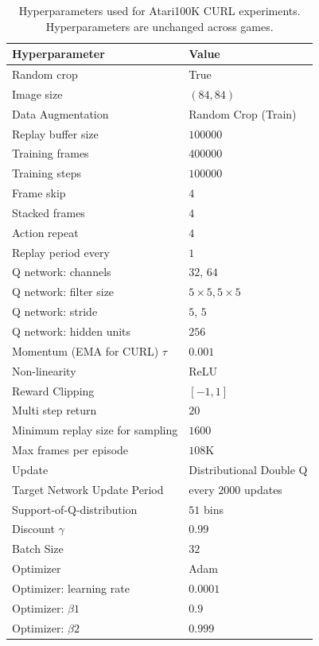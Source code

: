 \begin{table}[h]
\caption{Hyperparameters used for Atari100K CURL experiments. Hyperparameters are unchanged across games.}

\label{table:hyperparametersatari}
\vskip 0.15in
\begin{center}
\begin{small}
\begin{tabular}{ll}
\toprule
\textbf{Hyperparameter} & \textbf{Value}  \\
\midrule
Random crop    & True  \\ 
Image size    & $(84,84)$  \\ 
Data Augmentation & Random Crop (Train) \\
Replay buffer size    & $100000$ \\ 
Training frames & $400000$ \\ 
Training steps & $100000$ \\
Frame skip & $4$ \\
Stacked frames    & $4$  \\ 
Action repeat    & $4$ \\
Replay period every & $1$ \\
Q network: channels & $32$, $64$ \\
Q network: filter size & $5\times 5, 5\times 5$ \\
Q network: stride & $5$, $5$ \\
Q network: hidden units & $256$ \\
Momentum (EMA for CURL) $\tau$ & $0.001$  \\
Non-linearity & ReLU \\
Reward Clipping   & $[-1, 1]$  \\ 
Multi step return & $20$ \\
Minimum replay size for sampling & $1600$ \\ 
Max frames per episode & $108$K \\
Update & Distributional Double Q \\
Target Network Update Period & every $2000$ updates \\
Support-of-Q-distribution & $51$ bins \\ 
Discount $\gamma$ & $0.99$ \\
Batch Size & $32$  \\
Optimizer    & Adam  \\ 
Optimizer: learning rate & $0.0001$ \\
Optimizer: $\beta1$ & $0.9$ \\
Optimizer: $\beta2$ & $0.999$ \\ 

\end{tabular}
\end{small}
\end{center}
\end{table}
